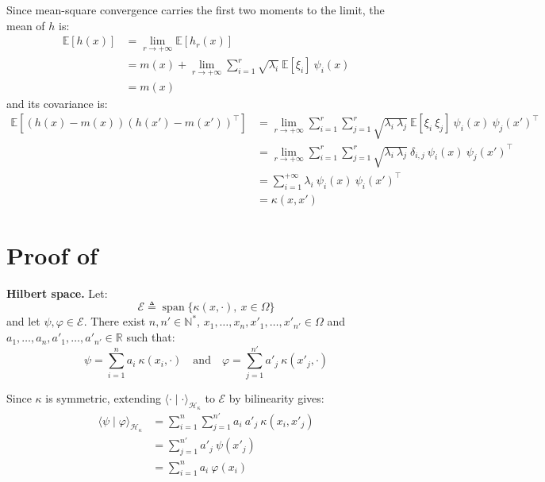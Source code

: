 Since mean-square convergence carries the first two moments to the limit, the mean of $h$ is:
\begin{equation}
	\begin{aligned}
	\mathbb{E}[h(x)]&=\lim_{r\to+\infty}\mathbb{E}[h_r(x)]\\
	&=m(x)+\lim_{r\to+\infty}\sum_{i=1}^r\sqrt{\lambda_i}\:\mathbb{E}[\xi_i]\:\psi_i(x)\\
	&=m(x)
	\end{aligned}
\end{equation}
and its covariance is:
\begin{equation}
	\begin{aligned}
	\mathbb{E}\left[(h(x)-m(x))(h(x')-m(x'))^\top\right]&=\lim_{r\to+\infty}\sum_{i=1}^r\sum_{j=1}^r\sqrt{\lambda_i\:\lambda_j}\:\mathbb{E}[\xi_i\:\xi_j]\:\psi_i(x)\:\psi_j(x')^\top\\
	&=\lim_{r\to+\infty}\sum_{i=1}^r\sum_{j=1}^r\sqrt{\lambda_i\:\lambda_j}\:\delta_{i,j}\:\psi_i(x)\:\psi_j(x')^\top\\
	&=\sum_{i=1}^{+\infty}\lambda_i\:\psi_i(x)\:\psi_i(x')^\top\\
	&=\kappa(x,x')
	\end{aligned}
\end{equation}

\section[Proof of Proposition 3.22]{Proof of }\label{sec:proof_native_RKHS}

\textbf{Hilbert space.} Let:
\begin{equation}
	\mathcal{E}\triangleq\operatorname{span}\{\kappa(x,\cdot),\:x\in\Omega\}
\end{equation}
and let $\psi,\varphi\in\mathcal{E}$. There exist $n,n'\in\mathbb{N}^*$, $x_1,\dots,x_n,x'_1,\dots,x'_{n'}\in\Omega$ and $a_1,\dots,a_n,a'_1,\dots,a'_{n'}\in\mathbb{R}$ such that:
\begin{equation}
	\psi=\sum_{i=1}^na_i\:\kappa(x_i,\cdot)\quad\text{and}\quad\varphi=\sum_{j=1}^{n'}a'_j\:\kappa(x'_j,\cdot)
\end{equation}

Since $\kappa$ is symmetric, extending $\langle\cdot\mid\cdot\rangle_{\mathcal{H}_\kappa}$ to $\mathcal{E}$ by bilinearity gives:
\begin{equation}
	\begin{aligned}
	\langle\psi\mid\varphi\rangle_{\mathcal{H}_\kappa}&=\sum_{i=1}^n\sum_{j=1}^{n'}a_i\:a'_j\:\kappa(x_i,x'_j)\\
	&=\sum_{j=1}^{n'}a'_j\:\psi(x'_j)\\
	&=\sum_{i=1}^na_i\:\varphi(x_i)
	\end{aligned}
\end{equation}

